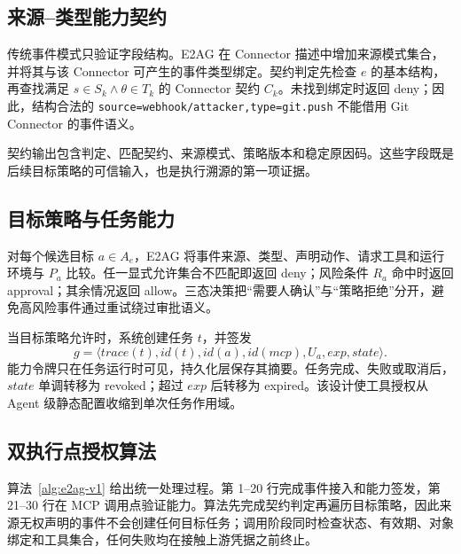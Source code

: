 

\subsection{来源--类型能力契约}

传统事件模式只验证字段结构。E2AG 在 Connector 描述中增加来源模式集合，并将其与该 Connector 可产生的事件类型绑定。契约判定先检查 $e$ 的基本结构，再查找满足 $s\in S_k\land\theta\in T_k$ 的 Connector 契约 $C_k$。未找到绑定时返回 deny；因此，结构合法的 \texttt{source=webhook/attacker,type=git.push} 不能借用 Git Connector 的事件语义。

契约输出包含判定、匹配契约、来源模式、策略版本和稳定原因码。这些字段既是后续目标策略的可信输入，也是执行溯源的第一项证据。

\subsection{目标策略与任务能力}

对每个候选目标 $a\in A_e$，E2AG 将事件来源、类型、声明动作、请求工具和运行环境与 $P_a$ 比较。任一显式允许集合不匹配即返回 deny；风险条件 $R_a$ 命中时返回 approval；其余情况返回 allow。三态决策把“需要人确认”与“策略拒绝”分开，避免高风险事件通过重试绕过审批语义。

当目标策略允许时，系统创建任务 $t$，并签发
\[
g=\langle trace(t),id(t),id(a),id(mcp),U_a,exp,state\rangle.
\]
能力令牌只在任务运行时可见，持久化层保存其摘要。任务完成、失败或取消后，$state$ 单调转移为 revoked；超过 $exp$ 后转移为 expired。该设计使工具授权从 Agent 级静态配置收缩到单次任务作用域。

\subsection{双执行点授权算法}

算法~\ref{alg:e2ag-v1} 给出统一处理过程。第 1--20 行完成事件接入和能力签发，第 21--30 行在 MCP 调用点验证能力。算法先完成契约判定再遍历目标策略，因此来源无权声明的事件不会创建任何目标任务；调用阶段同时检查状态、有效期、对象绑定和工具集合，任何失败均在接触上游凭据之前终止。

